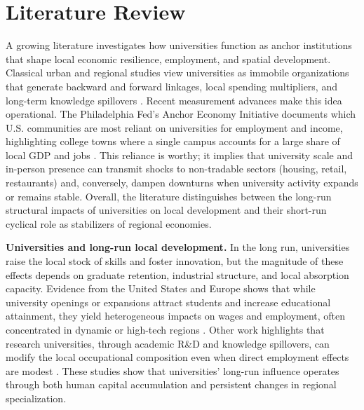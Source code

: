 
\section{ Literature Review}

\noindent A growing literature investigates how universities function as anchor institutions that shape local economic resilience, employment, and spatial development. Classical urban and regional studies view universities as immobile organizations that generate backward and forward linkages, local spending multipliers, and long-term knowledge spillovers \citep{Saxenian1996RegionalAdvantage,felsensteinUniversityMetropolitanArena1996}. Recent measurement advances make this idea operational. The Philadelphia Fed's Anchor Economy Initiative documents which U.S. communities are most reliant on universities for employment and income, highlighting college towns where a single campus accounts for a large share of local GDP and jobs \citep{Harker2024AnchorReliance}. This reliance is worthy; it implies that university scale and in-person presence can transmit shocks to non-tradable sectors (housing, retail, restaurants) and, conversely, dampen downturns when university activity expands or remains stable. Overall, the literature distinguishes between the long-run structural impacts of universities on local development and their short-run cyclical role as stabilizers of regional economies.

\noindent \textbf{Universities and long-run local development.} In the long run, universities raise the local stock of skills and foster innovation, but the magnitude of these effects depends on graduate retention, industrial structure, and local absorption capacity. Evidence from the United States and Europe shows that while university openings or expansions attract students and increase educational attainment, they yield heterogeneous impacts on wages and employment, often concentrated in dynamic or high-tech regions \citep{berlingieriCollegeOpeningsLocal2022,ferhatImpactUniversityOpenings,amendolaDoesGraduateHuman2020,abelCollegesUniversitiesIncrease2012}. Other work highlights that research universities, through academic R\&D and knowledge spillovers, can modify the local occupational composition even when direct employment effects are modest \citep{beesonEffectsCollegesUniversities,harrisUniversitiesAnchorInstitutions2016}. These studies show that universities' long-run influence operates through both human capital accumulation and persistent changes in regional specialization.

